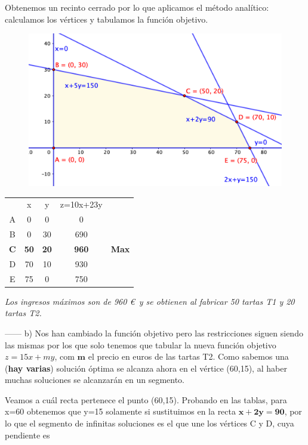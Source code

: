 \vspace{4mm} Obtenemos un recinto cerrado por lo que aplicamos el método analítico: calculamos los vértices y tabulamos la función objetivo.

\vspace{10mm} 
\begin{multicols}{2}
\begin{figure}[H]
	\centering
	\includegraphics[width=.5\textwidth]{imagenes/img35.png}
\end{figure}

\begin{table}[H]
\centering
\begin{tabular}{ccccc}
 & x & y & z=10x+23y &  \\ \cline{2-4}
A & 0 & 0 & 0 &  \\
B & 0 & 30 & 690 &  \\
\textbf{C} & \textbf{50} & \textbf{20} & \textbf{960} & \textbf{Max} \\
D & 70 & 10 & 930 &  \\
E & 75 & 0 & 750 & 
\end{tabular}
\end{table}
\end{multicols}

 
\emph{Los ingresos máximos son de 960 \euro $\,$ y se obtienen al fabricar 50 tartas T1 y 20 tartas T2.}

\vspace{5mm}
------ b) Nos han cambiado la función objetivo pero las restricciones siguen siendo las mismas por los que solo tenemos que tabular la nueva función objetivo $z=15x+my$, com $\boldsymbol{ m}$ el precio en euros de las tartas T2. Como sabemos una (\textbf{hay varias}) solución óptima se alcanza ahora en el vértice (60,15), al haber muchas soluciones se alcanzarán en un segmento.

\vspace{3mm} Veamos a cuál recta pertenece el punto (60,15). Probando en las tablas, para x=60 obtenemos que y=15 solamente si sustituimos en la recta $\boldsymbol{x+2y=90}$, por lo que el segmento de infinitas soluciones es el que une los vértices C y D, cuya pendiente es 

